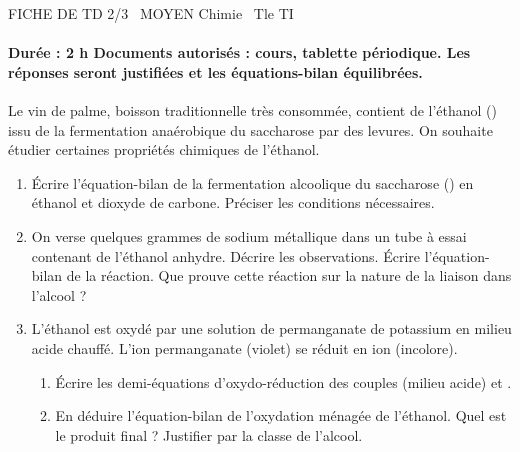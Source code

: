\documentclass[11pt]{article}
\begin{document}
\begin{tcolorbox}[enhanced,colback=popink,colframe=popink,arc=10pt,boxrule=0pt,left=12pt,right=12pt,top=9pt,bottom=9pt]
{\color{white}\popxbold\small FICHE DE TD 2/3 \textbullet\ MOYEN \hfill Chimie \textbullet\ Tle TI\par}
\end{tcolorbox}
\vspace{4pt}
\paragraph{Durée : 2 h \quad Documents autorisés : cours, tablette périodique. Les réponses seront justifiées et les équations-bilan équilibrées.}

\begin{exercice}
Le vin de palme, boisson traditionnelle très consommée, contient de l'éthanol () issu de la fermentation anaérobique du saccharose par des levures. On souhaite étudier certaines propriétés chimiques de l'éthanol.
\begin{enumerate}
    \item Écrire l'équation-bilan de la fermentation alcoolique du saccharose () en éthanol et dioxyde de carbone. Préciser les conditions nécessaires.
    \item On verse quelques grammes de sodium métallique dans un tube à essai contenant de l'éthanol anhydre. Décrire les observations. Écrire l'équation-bilan de la réaction. Que prouve cette réaction sur la nature de la liaison  dans l'alcool ?
    \item L'éthanol est oxydé par une solution de permanganate de potassium  en milieu acide chauffé. L'ion permanganate  (violet) se réduit en ion  (incolore).
    \begin{enumerate}
        \item Écrire les demi-équations d'oxydo-réduction des couples  (milieu acide) et .
        \item En déduire l'équation-bilan de l'oxydation ménagée de l'éthanol. Quel est le produit final ? Justifier par la classe de l'alcool.
    \end{enumerate}
\end{enumerate}
\end{exercice}
\end{document}

